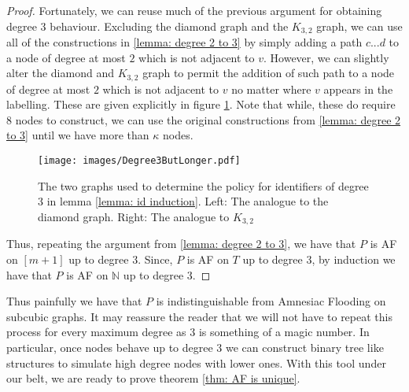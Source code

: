 \begin{proof}
    Fortunately, we can reuse much of the previous argument for obtaining degree $3$ behaviour.
    Excluding the diamond graph and the $K_{3,2}$ graph, we can use all of the constructions in \cref{lemma: degree 2 to 3} by simply adding a path $c...d$ to a node of degree at most $2$ which is not adjacent to $v$.
    However, we can slightly alter the diamond and $K_{3,2}$ graph to permit the addition of such path to a node of degree at most $2$ which is not adjacent to $v$ no matter where $v$ appears in the labelling.
    These are given explicitly in figure \cref{fig:degree 3 but longer}.
    Note that while, these do require $8$ nodes to construct, we can use the original constructions from \cref{lemma: degree 2 to 3} until we have more than $\kappa$ nodes.
    \begin{figure}
        \centering
        \texttt{[image: images/Degree3ButLonger.pdf]}
        \caption{The two graphs used to determine the policy for identifiers of degree 3 in lemma \ref{lemma: id induction}. Left: The analogue to the diamond graph. Right: The analogue to $K_{3,2}$}
        \label{fig:degree 3 but longer}
    \end{figure}
    Thus, repeating the argument from \cref{lemma: degree 2 to 3}, we have that $P$ is AF on $[m+1]$ up to degree $3$.
    Since, $P$ is AF on $T$ up to degree $3$, by induction we have that $P$ is AF on $\mathbb{N}$ up to degree $3$.
\end{proof}
Thus painfully we have that $P$ is indistinguishable from Amnesiac Flooding on subcubic graphs.
It may reassure the reader that we will not have to repeat this process for every maximum degree as $3$ is something of a magic number. 
In particular, once nodes behave up to degree $3$ we can construct binary tree like structures to simulate high degree nodes with lower ones.
With this tool under our belt, we are ready to prove theorem \ref{thm: AF is unique}.
